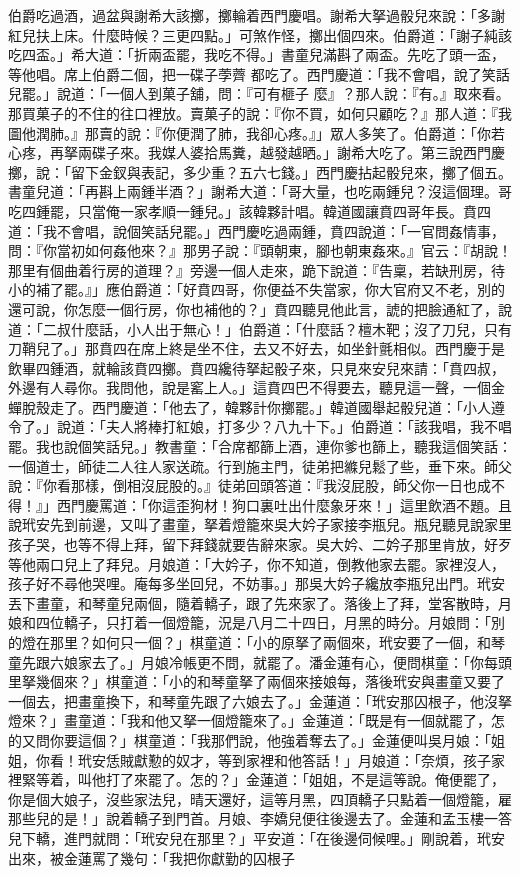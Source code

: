 伯爵吃過酒，過盆與謝希大該擲，擲輪着西門慶唱。謝希大拏過骰兒來說：「多謝紅兒扶上床。什麼時候？三更四點。」可煞作怪，擲出個四來。伯爵道：「謝子純該吃四盃。」希大道：「折兩盃罷，我吃不得。」書童兒滿斟了兩盃。先吃了頭一盃，等他唱。席上伯爵二個，把一碟子荸薺 都吃了。西門慶道：「我不會唱，說了笑話兒罷。」說道：「一個人到菓子舖，問：『可有榧子 麼』？那人說：『有。』取來看。那買菓子的不住的往口裡放。賣菓子的說：『你不買，如何只顧吃？』那人道：『我圖他潤肺。』那賣的說：『你便潤了肺，我卻心疼。』」眾人多笑了。伯爵道：「你若心疼，再拏兩碟子來。我媒人婆拾馬糞，越發越晒。」謝希大吃了。第三說西門慶擲，說：「留下金釵與表記，多少重？五六七錢。」西門慶拈起骰兒來，擲了個五。書童兒道：「再斟上兩鍾半酒？」謝希大道：「哥大量，也吃兩鍾兒？沒這個理。哥吃四鍾罷，只當俺一家孝順一鍾兒。」該韓夥計唱。韓道國讓賁四哥年長。賁四道：「我不會唱，說個笑話兒罷。」西門慶吃過兩鍾，賁四說道：「一官問姦情事，問：『你當初如何姦他來？』那男子說：『頭朝東，腳也朝東姦來。』官云：『胡說！那里有個曲着行房的道理？』旁邊一個人走來，跪下說道：『告稟，若缺刑房，待小的補了罷。』」應伯爵道：「好賁四哥，你便益不失當家，你大官府又不老，別的還可說，你怎麼一個行房，你也補他的？」賁四聽見他此言，諕的把臉通紅了，說道：「二叔什麼話，小人出于無心！」伯爵道：「什麼話？檀木靶；沒了刀兒，只有刀鞘兒了。」那賁四在席上終是坐不住，去又不好去，如坐針氈相似。西門慶于是飲畢四鍾酒，就輪該賁四擲。賁四纔待拏起骰子來，只見來安兒來請：「賁四叔，外邊有人尋你。我問他，說是窰上人。」這賁四巴不得要去，聽見這一聲，一個金蟬脫殼走了。西門慶道：「他去了，韓夥計你擲罷。」韓道國舉起骰兒道：「小人遵令了。」說道：「夫人將棒打紅娘，打多少？八九十下。」伯爵道：「該我唱，我不唱罷。我也說個笑話兒。」教書童：「合席都篩上酒，連你爹也篩上，聽我這個笑話：一個道士，師徒二人往人家送疏。行到施主門，徒弟把縧兒鬆了些，垂下來。師父說：『你看那樣，倒相沒屁股的。』徒弟回頭答道：『我沒屁股，師父你一日也成不得！』」西門慶罵道：「你這歪狗材！狗口裏吐出什麼象牙來！」這里飲酒不題。且說玳安先到前邊，又叫了畫童，拏着燈籠來吳大妗子家接李瓶兒。瓶兒聽見說家里孩子哭，也等不得上拜，留下拜錢就要告辭來家。吳大妗、二妗子那里肯放，好歹等他兩口兒上了拜兒。月娘道：「大妗子，你不知道，倒教他家去罷。家裡沒人，孩子好不尋他哭哩。庵每多坐回兒，不妨事。」那吳大妗子纔放李瓶兒出門。玳安丟下畫童，和琴童兒兩個，隨着轎子，跟了先來家了。落後上了拜，堂客散時，月娘和四位轎子，只打着一個燈籠，況是八月二十四日，月黑的時分。月娘問：「別的燈在那里？如何只一個？」棋童道：「小的原拏了兩個來，玳安要了一個，和琴童先跟六娘家去了。」月娘冷帳更不問，就罷了。潘金蓮有心，便問棋童：「你每頭里拏幾個來？」棋童道：「小的和琴童拏了兩個來接娘每，落後玳安與畫童又要了一個去，把畫童換下，和琴童先跟了六娘去了。」金蓮道：「玳安那囚根子，他沒拏燈來？」畫童道：「我和他又拏一個燈籠來了。」金蓮道：「既是有一個就罷了，怎的又問你要這個？」棋童道：「我那們說，他強着奪去了。」金蓮便叫吳月娘：「姐姐，你看！玳安恁賊獻懃的奴才，等到家裡和他答話！」月娘道：「奈煩，孩子家裡緊等着，叫他打了來罷了。怎的？」金蓮道：「姐姐，不是這等說。俺便罷了，你是個大娘子，沒些家法兒，晴天還好，這等月黑，四頂轎子只點着一個燈籠，雇那些兒的是！」說着轎子到門首。月娘、李嬌兒便往後邊去了。金蓮和孟玉樓一答兒下轎，進門就問：「玳安兒在那里？」平安道：「在後邊伺候哩。」剛說着，玳安出來，被金蓮罵了幾句：「我把你獻勤的囚根子